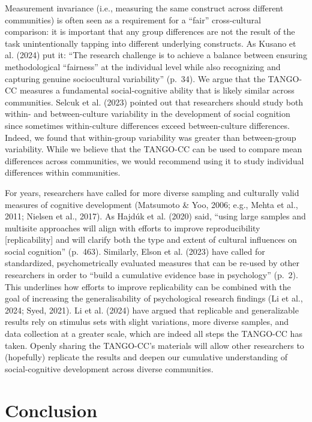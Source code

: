 \documentclass[
  man,floatsintext]{apa7}
\begin{document}
Measurement invariance (i.e., measuring the same construct across different communities) is often seen as a requirement for a ``fair'' cross-cultural comparison: it is important that any group differences are not the result of the task unintentionally tapping into different underlying constructs.
As Kusano et al. (2024) put it: ``The research challenge is to achieve a balance between ensuring methodological ``fairness'' at the individual level while also recognizing and capturing genuine sociocultural variability'' (p.~34).
We argue that the TANGO-CC measures a fundamental social-cognitive ability that is likely similar across communities.
Selcuk et al. (2023) pointed out that researchers should study both within- and between-culture variability in the development of social cognition since sometimes within-culture differences exceed between-culture differences.
Indeed, we found that within-group variability was greater than between-group variability.
While we believe that the TANGO-CC can be used to compare mean differences across communities, we would recommend using it to study individual differences within communities.

For years, researchers have called for more diverse sampling and culturally valid measures of cognitive development (Matsumoto \& Yoo, 2006; e.g., Mehta et al., 2011; Nielsen et al., 2017).
As Hajdúk et al. (2020) said, ``using large samples and multisite approaches will align with efforts to improve reproducibility {[}replicability{]} and will clarify both the type and extent of cultural influences on social cognition'' (p.~463).
Similarly, Elson et al. (2023) have called for standardized, psychometrically evaluated measures that can be re-used by other researchers in order to ``build a cumulative evidence base in psychology'' (p.~2).
This underlines how efforts to improve replicability can be combined with the goal of increasing the generalisability of psychological research findings (Li et al., 2024; Syed, 2021).
Li et al. (2024) have argued that replicable and generalizable results rely on stimulus sets with slight variations, more diverse samples, and data collection at a greater scale, which are indeed all steps the TANGO-CC has taken.
Openly sharing the TANGO-CC's materials will allow other researchers to (hopefully) replicate the results and deepen our cumulative understanding of social-cognitive development across diverse communities.

\section{Conclusion}\label{conclusion}
\end{document}
